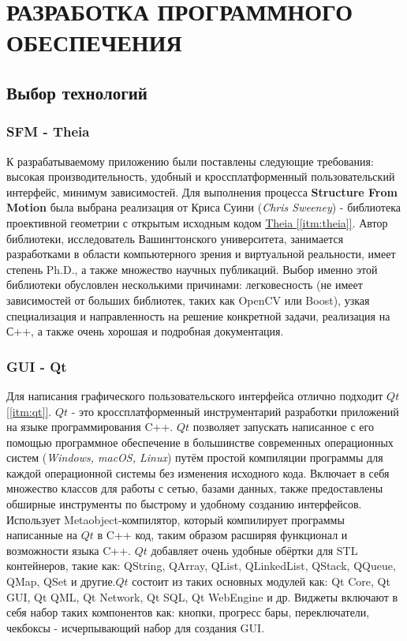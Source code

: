 \chapter{РАЗРАБОТКА ПРОГРАММНОГО ОБЕСПЕЧЕНИЯ}

\section{Выбор технологий}

\subsection{SFM - Theia}
К разрабатываемому приложению были поставлены следующие требования: высокая производительность, удобный и кроссплатформенный пользовательский интерфейс, минимум зависимостей. Для выполнения процесса \textbf{Structure From Motion} была выбрана реализация от Криса Суини (\textit{Chris Sweeney}) - библиотека проективной геометрии с открытым исходным кодом \hyperref[itm:theia]{Theia [\ref{itm:theia}]}. Автор библиотеки, исследователь Вашингтонского университета, занимается разработками в области компьютерного зрения и виртуальной реальности, имеет степень Ph.D., а также множество научных публикаций. Выбор именно этой библиотеки обусловлен несколькими причинами: легковесность (не имеет зависимостей от больших библиотек, таких как OpenCV или Boost), узкая специализация и направленность на решение конкретной задачи, реализация на С++, а также очень хорошая и подробная документация.

\subsection{GUI - Qt}
Для написания графического пользовательского интерфейса отлично подходит \hyperref[itm:qt]{$Qt$ [\ref{itm:qt}]}. $Qt$ - это кроссплатформенный инструментарий разработки приложений на языке программирования C++. $Qt$ позволяет запускать написанное с его помощью программное обеспечение в большинстве современных операционных систем (\textit{Windows, macOS, Linux}) путём простой компиляции программы для каждой операционной системы без изменения исходного кода. Включает в себя множество классов для работы с сетью, базами данных, также предоставлены обширные инструменты по быстрому и удобному созданию интерфейсов. Использует Metaobject-компилятор, который компилирует программы написанные на $Qt$ в C++ код, таким образом расширяя функционал и возможности языка C++. $Qt$ добавляет очень удобные обёртки для STL контейнеров, такие как: QString, QArray, QList, QLinkedList, QStack, QQueue, QMap, QSet и другие.$Qt$ состоит из таких основных модулей как: Qt Core, Qt GUI, Qt QML, Qt Network, Qt SQL, Qt WebEngine и др. Виджеты включают в себя набор таких компонентов как: кнопки, прогресс бары, переключатели, чекбоксы - исчерпывающий набор для создания GUI.

